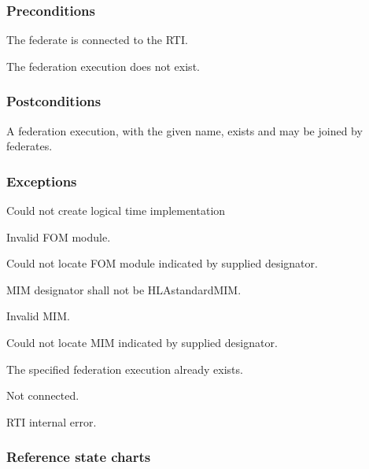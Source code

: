 \clearpage


\subsubsection{Preconditions}

\begin{stdalphalist}
    \item The federate is connected to the RTI.
    \item The federation execution does not exist.
\end{stdalphalist}

\subsubsection{Postconditions}

\begin{stdalphalist}
    \item A federation execution, with the given name, exists and may be joined by federates.
\end{stdalphalist}

\subsubsection{Exceptions}

\begin{stdalphalist}
    \item Could not create logical time implementation
    \item Invalid FOM module.
    \item Could not locate FOM module indicated by supplied designator.
    \item MIM designator shall not be HLAstandardMIM.
    \item Invalid MIM.
    \item Could not locate MIM indicated by supplied designator.
    \item The specified federation execution already exists.
    \item Not connected.
    \item RTI internal error.
\end{stdalphalist}

\subsubsection{Reference state charts}

